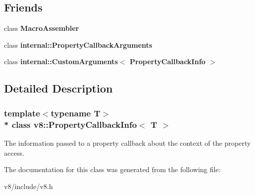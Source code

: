 \subsection*{Friends}
\begin{DoxyCompactItemize}
\item 
class {\bfseries Macro\+Assembler}\hypertarget{classv8_1_1PropertyCallbackInfo_ae605ff1d9d93250ace8a0a8b8d1dee67}{}\label{classv8_1_1PropertyCallbackInfo_ae605ff1d9d93250ace8a0a8b8d1dee67}

\item 
class {\bfseries internal\+::\+Property\+Callback\+Arguments}\hypertarget{classv8_1_1PropertyCallbackInfo_a1ba96a1268a72c23f50314cd99c76f1b}{}\label{classv8_1_1PropertyCallbackInfo_a1ba96a1268a72c23f50314cd99c76f1b}

\item 
class {\bfseries internal\+::\+Custom\+Arguments$<$ Property\+Callback\+Info $>$}\hypertarget{classv8_1_1PropertyCallbackInfo_ad1d1e15ddaed2ab44e8f21c5564881ba}{}\label{classv8_1_1PropertyCallbackInfo_ad1d1e15ddaed2ab44e8f21c5564881ba}

\end{DoxyCompactItemize}


\subsection{Detailed Description}
\subsubsection*{template$<$typename T$>$\\*
class v8\+::\+Property\+Callback\+Info$<$ T $>$}

The information passed to a property callback about the context of the property access. 

The documentation for this class was generated from the following file\+:\begin{DoxyCompactItemize}
\item 
v8/include/v8.\+h\end{DoxyCompactItemize}
